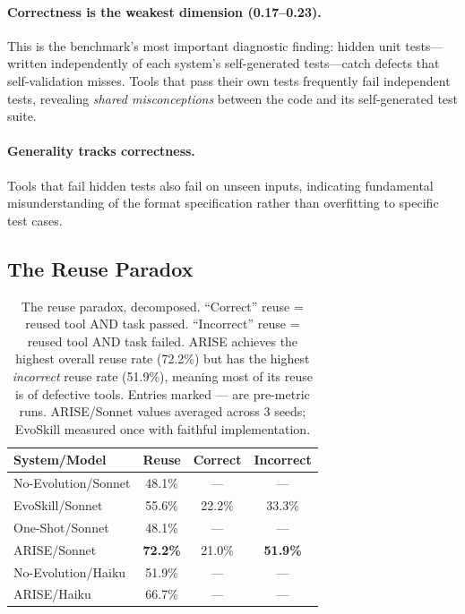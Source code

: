 \documentclass[10pt,twocolumn]{article}
\begin{document}
\paragraph{Correctness is the weakest dimension (0.17--0.23).} This is the benchmark's most important diagnostic finding: hidden unit tests---written independently of each system's self-generated tests---catch defects that self-validation misses. Tools that pass their own tests frequently fail independent tests, revealing \emph{shared misconceptions} between the code and its self-generated test suite.

\paragraph{Generality tracks correctness.} Tools that fail hidden tests also fail on unseen inputs, indicating fundamental misunderstanding of the format specification rather than overfitting to specific test cases.

\subsection{The Reuse Paradox}
\label{sec:reuse_analysis}

\begin{table}[t]
\centering
\footnotesize
\begin{tabular}{lccc}
\toprule
\textbf{System/Model} & \textbf{Reuse} & \textbf{Correct} & \textbf{Incorrect} \\
\midrule
No-Evolution/Sonnet & 48.1\% & --- & --- \\
EvoSkill/Sonnet & 55.6\% & 22.2\% & 33.3\% \\
One-Shot/Sonnet & 48.1\% & --- & --- \\
ARISE/Sonnet & \textbf{72.2\%} & 21.0\% & \textbf{51.9\%} \\
\midrule
No-Evolution/Haiku & 51.9\% & --- & --- \\
ARISE/Haiku & 66.7\% & --- & --- \\
\bottomrule
\end{tabular}
\caption{The reuse paradox, decomposed. ``Correct'' reuse = reused tool AND task passed. ``Incorrect'' reuse = reused tool AND task failed. ARISE achieves the highest overall reuse rate (72.2\%) but has the highest \emph{incorrect} reuse rate (51.9\%), meaning most of its reuse is of defective tools. Entries marked --- are pre-metric runs. ARISE/Sonnet values averaged across 3 seeds; EvoSkill measured once with faithful implementation.}
\label{tab:reuse}
\end{table}
\end{document}

